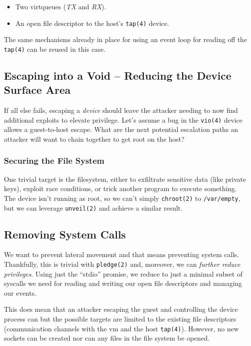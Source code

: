 \documentclass[conference]{IEEEtran}
\begin{document}
\vspace{2mm}
\begin{itemize}
  \item Two virtqueues (\emph{TX} and \emph{RX}).
  \item An open file descriptor to the host's \texttt{tap(4)} device.
\end{itemize}
\vspace{2mm}

The same mechanisms already in place for using an event loop for
reading off the \texttt{tap(4)} can be reused in this case.


\vspace{3mm}
\subsection{Escaping into a Void -- Reducing the Device Surface Area}
If all else fails, escaping a \emph{device} should leave the attacker
needing to now find additional exploits to elevate privilege. Let's
assume a bug in the \texttt{vio(4)} device allows a guest-to-host
escape. What are the next potential escalation paths an attacker will
want to chain together to get root on the host?

\vspace{2mm}
\subsubsection{Securing the File System}
One trivial target is the filesystem, either to exfiltrate sensitive
data (like private keys), exploit race conditions, or trick another
program to execute something. The device isn't running as root, so we
can't simply \texttt{chroot(2)} to \texttt{/var/empty}, but we can
leverage \texttt{unveil(2)} and achieve a similar result.

\vspace{2mm}
\subsection{Removing System Calls}
We want to prevent lateral movement and that means preventing system
calls. Thankfully, this is trivial with \texttt{pledge(2)} and,
moreover, we can \emph{further reduce privileges}. Using just the
``stdio'' promise, we reduce to just a minimal subset of syscalls we
need for reading and writing our open file descriptors and managing
our events.

This does mean that an attacker escaping the guest and controlling the
device process can  but the possible targets
are limited to the existing file descriptors (communication channels
with the vm and the host \texttt{tap(4)}). However, no new sockets can
be created nor can any files in the file system be opened.
\end{document}
